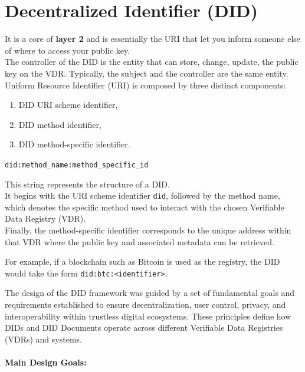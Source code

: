 \section{Decentralized Identifier (DID)}
It is a core of \textbf{layer 2} and is essentially the URI that let you inform someone else of where to access your public key.\\
The controller of the DID is the entity that can store, change, update, the public key on the VDR. Typically, the subject and the controller are the same entity.\\

\noindent
Uniform Resource Identifier (URI) is composed by three distinct components:

\begin{enumerate}
    \item DID URI scheme identifier,
    \item DID method identifier,
    \item DID method-specific identifier.
\end{enumerate}

\medskip
\begin{center}
\texttt{did:method\_name:method\_specific\_id}
\end{center}

\medskip

\noindent
This string represents the structure of a DID.\\ 
It begins with the URI scheme identifier \texttt{did}, followed by  the method name, which denotes the specific method used to interact with the chosen Verifiable Data Registry (VDR).\\ 
Finally, the method-specific identifier corresponds to the unique address within that VDR where the public key and associated metadata can be retrieved.

\smallskip

\noindent
For example, if a blockchain such as Bitcoin is used as the registry, the DID would take the form \texttt{did:btc:<identifier>}.

\bigskip

\noindent
The design of the DID framework was guided by a set of fundamental goals and requirements established to ensure decentralization, user control, privacy, and interoperability within trustless digital ecosystems.  
These principles define how DIDs and DID Documents operate across different Verifiable Data Registries (VDRs) and systems.

\paragraph{Main Design Goals:}

